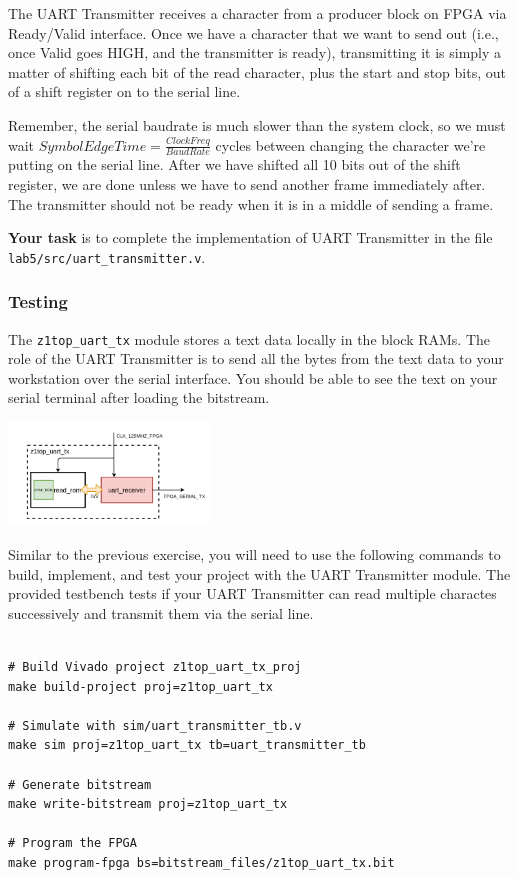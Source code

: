 \documentclass[11pt]{article}
\begin{document}
The UART Transmitter receives a character from a producer block on FPGA via Ready/Valid interface. Once we have a character that we want to send out (i.e., once Valid goes HIGH, and the transmitter is ready), transmitting it is simply a matter of shifting each bit of the read character, plus the start and stop bits, out of a shift register on to the serial line.

Remember, the serial baudrate is much slower than the system clock, so we must wait $SymbolEdgeTime = \frac{ClockFreq}{BaudRate}$ cycles between changing the character we're putting on the serial line.
After we have shifted all 10 bits out of the shift register, we are done unless we have to send another frame immediately after. The transmitter should not be ready when it is in a middle of sending a frame.

\textbf{Your task} is to complete the implementation of UART Transmitter in the file \verb|lab5/src/uart_transmitter.v|.

\subsubsection{Testing}

The \verb|z1top_uart_tx| module stores a text data locally in the block RAMs. The role of the UART Transmitter is to send all the bytes from the text data to your workstation over the serial interface. You should be able to see the text on your serial terminal after loading the bitstream.

\begin{center}
\includegraphics[width=0.4\textwidth]{figs/z1top_uart_tx.png}
\end{center}

Similar to the previous exercise, you will need to use the following commands to build, implement, and test your project with the UART Transmitter module. The provided testbench tests if your UART Transmitter can read multiple charactes successively and transmit them via the serial line.

\begin{verbatim}

# Build Vivado project z1top_uart_tx_proj
make build-project proj=z1top_uart_tx

# Simulate with sim/uart_transmitter_tb.v
make sim proj=z1top_uart_tx tb=uart_transmitter_tb

# Generate bitstream
make write-bitstream proj=z1top_uart_tx

# Program the FPGA
make program-fpga bs=bitstream_files/z1top_uart_tx.bit
\end{verbatim}
\end{document}
